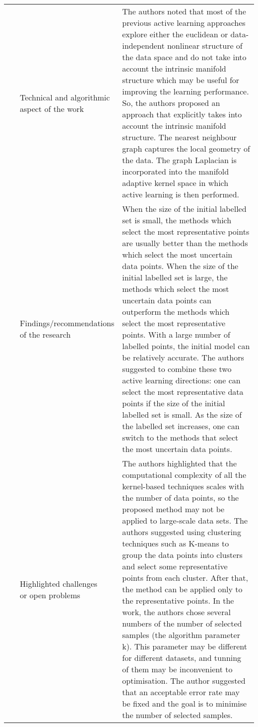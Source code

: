 \begin{landscape}
\begin{longtable}{lp{}p{}}
	\multirow{3}[0]{*}{~\citep{Cai2012}} & 
    \specialcell{Technical and algorithmic \\ aspect of the work} &
	The authors noted that most of the previous active learning approaches explore either the euclidean or data-independent nonlinear structure of the data space and do not take into account the intrinsic manifold structure which may be useful for improving the learning performance. So, the authors proposed an approach that explicitly takes into account the intrinsic manifold structure. The nearest neighbour graph captures the local geometry of the data. The graph Laplacian is incorporated into the manifold adaptive kernel space in which active learning is then performed.    
    \\ & 
    \specialcell{Findings/recommendations \\ of the research} & 
	When the size of the initial labelled set is small, the methods which select the most representative points are usually better than the methods which select the most uncertain data points. When the size of the initial labelled set is large, the methods which select the most uncertain data points can outperform the methods which select the most representative points. With a large number of labelled points, the initial model can be relatively accurate. The authors suggested to combine these two active learning directions: one can select the most representative data points if the size of the initial labelled set is small. As the size of the labelled set increases, one can switch to the methods that select the most uncertain data points.
    \\ & 
    \specialcell{Highlighted challenges \\ or open problems} & 
    The authors highlighted that the computational complexity of all the kernel-based techniques scales with the number of data points, so the proposed method may not be applied to large-scale data sets. The authors suggested using clustering techniques such as K-means to group the data points into clusters and select some representative points from each cluster. After that, the method can be applied only to the representative points. In the work, the authors chose several numbers of the number of selected samples (the algorithm parameter k). This parameter may be different for different datasets, and tunning of them may be inconvenient to optimisation. The author suggested that an acceptable error rate may be fixed and the goal is to minimise the number of selected samples.
	\\
	

\end{longtable}
\end{landscape}
